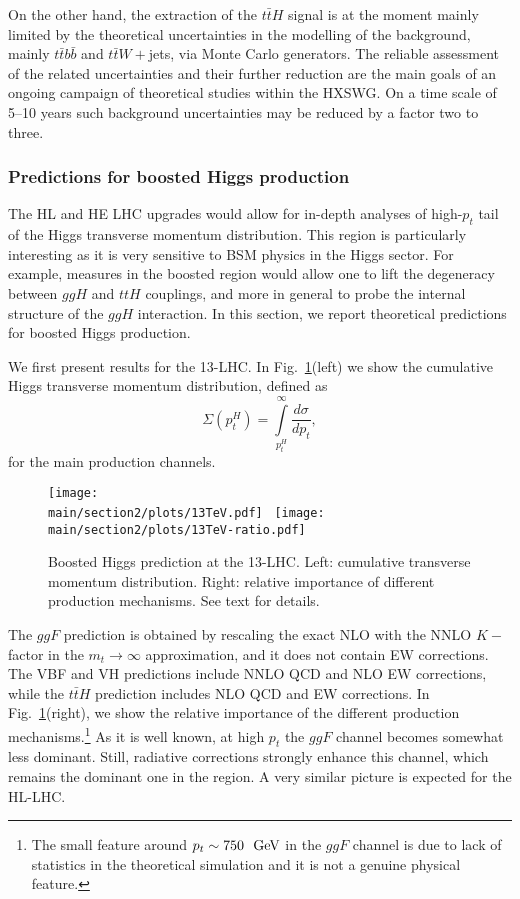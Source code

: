 On the other hand, the extraction of the $t \bar t H$ signal is at the moment mainly
limited by the theoretical uncertainties in the modelling of the background,
mainly $t\bar t b \bar b$ and $t \bar t W+$jets, via Monte Carlo generators. The reliable assessment of
the related uncertainties and their further reduction are the main goals of an
ongoing campaign of theoretical studies within the HXSWG. On a time scale of
5--10 years such background uncertainties may be reduced by a factor two to
three.

\subsubsection{Predictions for boosted Higgs production}
The HL and HE LHC upgrades would allow for in-depth analyses of high-$p_t$ tail of the Higgs
transverse momentum distribution. This region is particularly interesting as it is
very sensitive to BSM physics in the Higgs sector. For example, measures in the boosted region would 
allow one to lift the degeneracy between $ggH$ and $ttH$ couplings, and more in general to 
probe the internal structure of the $ggH$ interaction. In this section, we report theoretical
predictions for boosted Higgs production. 

We first present results for the 13-\UTeV LHC. In Fig.~\ref{fig:boosted13}(left) we show the cumulative Higgs 
transverse momentum distribution, defined as
$$
\Sigma(p_t^H) = \int\limits_{p_t^H}^{\infty} \frac{d\sigma}{d p_t},
$$
for the main production channels.
\begin{figure}[h]
\begin{center}
    \texttt{[image: \\main/section2/plots/13TeV.pdf]}~
    \texttt{[image: \\main/section2/plots/13TeV-ratio.pdf]}
    \caption{
    Boosted Higgs prediction at the 13-\UTeV LHC. Left: cumulative transverse momentum distribution.
    Right: relative importance of different production mechanisms. See text for details. 
        \label{fig:boosted13}}
        \end{center}
\end{figure}
The $ggF$ prediction is obtained by rescaling the exact NLO with the NNLO $K-$factor in the $m_t\to\infty$
approximation, and it does not contain EW corrections. The VBF and VH predictions include NNLO QCD
and NLO EW corrections, while the $t\bar t H$ prediction includes NLO QCD and EW corrections. In
Fig.~\ref{fig:boosted13}(right), we show the relative importance of the different production mechanisms.\footnote{
The small feature around $p_t\sim 750~{\rm ~\text{GeV}}$ in the $ggF$ channel is due to lack of statistics in the
theoretical simulation and it is not a genuine physical feature.}
As it is well known, at high $p_t$ the $ggF$ channel becomes somewhat less dominant. Still, radiative
corrections strongly enhance this channel, which remains the dominant one in the \UTeV region. A very similar picture is expected for the HL-LHC. 

